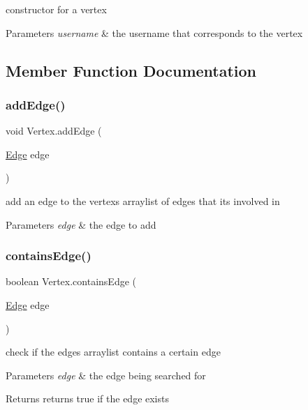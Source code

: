 constructor for a vertex 


\begin{DoxyParams}{Parameters}
{\em username} & the username that corresponds to the vertex \\
\hline
\end{DoxyParams}


\subsection{Member Function Documentation}
\mbox{\label{class_vertex_a77dbe86276566b77bdb2d631472660cf}} 
\subsubsection{\texorpdfstring{add\+Edge()}{addEdge()}}
{\footnotesize\ttfamily void Vertex.\+add\+Edge (\begin{DoxyParamCaption}\item[{\hyperlink{class_edge}{Edge}}]{edge }\end{DoxyParamCaption})}



add an edge to the vertex\textquotesingle{}s arraylist of edges that its involved in 


\begin{DoxyParams}{Parameters}
{\em edge} & the edge to add \\
\hline
\end{DoxyParams}
\mbox{\label{class_vertex_a4a77d1c66be46bef636154798bb3b96d}} 
\subsubsection{\texorpdfstring{contains\+Edge()}{containsEdge()}}
{\footnotesize\ttfamily boolean Vertex.\+contains\+Edge (\begin{DoxyParamCaption}\item[{\hyperlink{class_edge}{Edge}}]{edge }\end{DoxyParamCaption})}



check if the edges arraylist contains a certain edge 


\begin{DoxyParams}{Parameters}
{\em edge} & the edge being searched for \\
\hline
\end{DoxyParams}
\begin{DoxyReturn}{Returns}
returns true if the edge exists 
\end{DoxyReturn}
\mbox{\label{class_vertex_a428fe1ef66c8422b3af1aa4566360f13}} 

